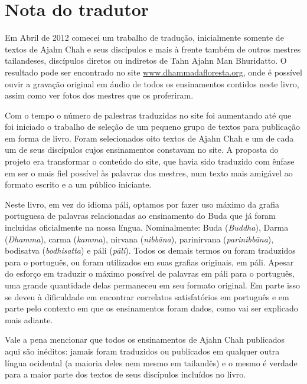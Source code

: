 
\chapter{Nota do tradutor}

Em Abril de 2012 comecei um trabalho de tradução, inicialmente
somente de textos de Ajahn Chah e seus discípulos e mais à frente
também de outros mestres tailandeses, discípulos diretos ou indiretos
de Tahn Ajahn Man Bhuridatto. O resultado pode ser encontrado no site
\href{http://www.dhammadafloresta.org/}{www.dhammadafloresta.org},
onde é possível ouvir a gravação original em áudio de todos os
ensinamentos contidos neste livro, assim como ver fotos dos mestres que
os proferiram. 

Com o tempo o número de palestras traduzidas no site foi aumentando
até que foi iniciado o trabalho de seleção de um
pequeno grupo de textos para publicação em forma de livro. Foram
selecionados oito textos de Ajahn Chah e um de cada um de seus
discípulos cujos ensinamentos constavam no site. A proposta do projeto
era transformar o conteúdo do site, que havia sido traduzido com ênfase
em ser o mais fiel possível às palavras dos mestres, num texto mais
amigável ao formato escrito e a um público iniciante. 

Neste livro, em vez do idioma páli, optamos por fazer uso máximo da
grafia portuguesa de palavras relacionadas ao ensinamento do Buda que
já foram incluídas oficialmente na nossa língua. Nominalmente: Buda
(\emph{Buddha}), Darma (\emph{Dhamma}), carma (\emph{kamma}),
nirvana (\emph{nibbāna}), parinirvana (\emph{parinibbāna}),
bodisatva (\emph{bodhisatta}) e páli (\emph{pāli}). Todos os
demais termos ou foram traduzidos para o português, ou foram utilizados
em suas grafias originais, em páli. Apesar do esforço em traduzir o
máximo possível de palavras em páli para o português, uma grande
quantidade delas permaneceu em seu formato original. Em parte isso se
deveu à dificuldade em encontrar correlatos satisfatórios em português
e em parte pelo contexto em que os ensinamentos foram dados, como vai
ser explicado mais adiante.

Vale a pena mencionar que todos os ensinamentos de Ajahn Chah
publicados aqui são inéditos: jamais foram traduzidos ou publicados em
qualquer outra língua ocidental (a maioria deles nem mesmo em
tailandês) e o mesmo é verdade para a maior parte dos textos de seus
discípulos incluídos no livro. 

